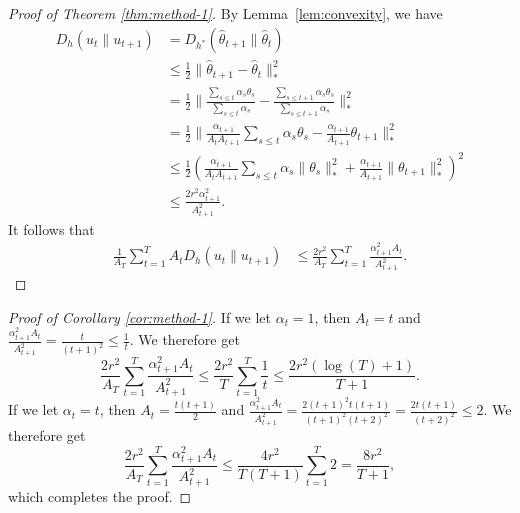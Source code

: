\documentclass{article} %
\begin{document}
\begin{proof}[Proof of Theorem \ref{thm:method-1}]
By Lemma~\ref{lem:convexity}, we have 
\begin{align*} 
D_h(u_t \| u_{t+1}) &= D_{h^*}(\hat{\theta}_{t+1} \| \hat{\theta}_{t}) \\
 &\leq \frac{1}{2}\|\hat\theta_{t+1}-\hat\theta_{t}\|_{*}^2 \\
 &= \frac{1}{2}\|\frac{\sum_{s \leq t}\alpha_s\theta_s}{\sum_{s \leq t} \alpha_s} - \frac{\sum_{s \leq t+1}\alpha_s\theta_s}{\sum_{s \leq t+1} \alpha_s}\|_{*}^2 \\
 &= \frac{1}{2}\|\frac{\alpha_{t+1}}{A_tA_{t+1}} \sum_{s \leq t} \alpha_s\theta_s - \frac{\alpha_{t+1}}{A_{t+1}} \theta_{t+1}\|_{*}^2 \\
 &\leq \frac{1}{2} \left(\frac{\alpha_{t+1}}{A_tA_{t+1}} \sum_{s \leq t} \alpha_s\|\theta_s\|_{*}^2 + \frac{\alpha_{t+1}}{A_{t+1}} \|\theta_{t+1}\|_{*}^2\right)^2 \\
 &\leq \frac{2r^2\alpha_{t+1}^2}{A_{t+1}^2}.
\end{align*}
It follows that 
\begin{align*}
\frac{1}{A_T} \sum_{t=1}^T A_tD_h(u_t \| u_{t+1}) &\leq \frac{2r^2}{A_T} \sum_{t=1}^T \frac{\alpha_{t+1}^2A_t}{A_{t+1}^2}.
\end{align*}
\end{proof}

\begin{proof}[Proof of Corollary \ref{cor:method-1}]
If we let $\alpha_t = 1$, then $A_t = t$ and $\frac{\alpha_{t+1}^2A_t}{A_{t+1}^2} = \frac{t}{(t+1)^{2}} \le \frac{1}{t}$.
We therefore get
\begin{equation}
\frac{2r^2}{A_T} \sum_{t=1}^T \frac{\alpha_{t+1}^2A_t}{A_{t+1}^2} \leq \frac{2r^2}{T} \sum_{t=1}^{T}\frac{1}{t} \leq \frac{2r^2(\log (T) + 1)}{T+1}.
\end{equation}
If we let $\alpha_t = t$, then $A_t = \frac{t(t+1)}{2}$ and 
$\frac{\alpha_{t+1}^2A_t}{A_{t+1}^2} = \frac{2(t+1)^2t(t+1)}{(t+1)^2(t+2)^2} = \frac{2t(t+1)}{(t+2)^2} \leq 2$.
We therefore get
\begin{equation}
\frac{2r^2}{A_T} \sum_{t=1}^T \frac{\alpha_{t+1}^2A_t}{A_{t+1}^2} \leq \frac{4r^2}{T(T+1)} \sum_{t=1}^{T}2 = \frac{8r^2}{T+1},
\end{equation}
which completes the proof.
\end{proof}
\end{document}
